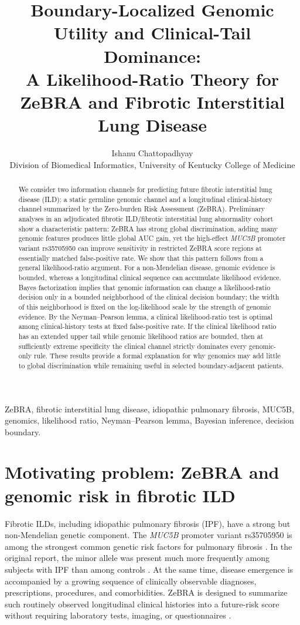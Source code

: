 \documentclass[journal]{IEEEtran}
\title{Boundary-Localized Genomic Utility and Clinical-Tail Dominance:\\
A Likelihood-Ratio Theory for ZeBRA and Fibrotic Interstitial Lung Disease}
\author{Ishanu Chattopadhyay\\
Division of Biomedical Informatics, University of Kentucky College of Medicine}
\begin{document}
\maketitle

\begin{abstract}
We consider two information channels for predicting future fibrotic interstitial lung disease (ILD): a static germline genomic channel and a longitudinal clinical-history channel summarized by the Zero-burden Risk Assessment (ZeBRA). Preliminary analyses in an adjudicated fibrotic ILD/fibrotic interstitial lung abnormality cohort show a characteristic pattern: ZeBRA has strong global discrimination, adding many genomic features produces little global AUC gain, yet the high-effect \textit{MUC5B} promoter variant rs35705950 can improve sensitivity in restricted ZeBRA score regions at essentially matched false-positive rate. We show that this pattern follows from a general likelihood-ratio argument. For a non-Mendelian disease, genomic evidence is bounded, whereas a longitudinal clinical sequence can accumulate likelihood evidence. Bayes factorization implies that genomic information can change a likelihood-ratio decision only in a bounded neighborhood of the clinical decision boundary; the width of this neighborhood is fixed on the log-likelihood scale by the strength of genomic evidence. By the Neyman--Pearson lemma, a clinical likelihood-ratio test is optimal among clinical-history tests at fixed false-positive rate. If the clinical likelihood ratio has an extended upper tail while genomic likelihood ratios are bounded, then at sufficiently extreme specificity the clinical channel strictly dominates every genomic-only rule. These results provide a formal explanation for why genomics may add little to global discrimination while remaining useful in selected boundary-adjacent patients.
\end{abstract}

\begin{IEEEkeywords}
ZeBRA, fibrotic interstitial lung disease, idiopathic pulmonary fibrosis, MUC5B, genomics, likelihood ratio, Neyman--Pearson lemma, Bayesian inference, decision boundary.
\end{IEEEkeywords}

\section{Motivating problem: ZeBRA and genomic risk in fibrotic ILD}

Fibrotic ILDs, including idiopathic pulmonary fibrosis (IPF), have a strong but non-Mendelian genetic component. The \textit{MUC5B} promoter variant rs35705950 is among the strongest common genetic risk factors for pulmonary fibrosis \cite{Seibold2011,Fingerlin2013,Allen2020}. In the original report, the minor allele was present much more frequently among subjects with IPF than among controls \cite{Seibold2011}. At the same time, disease emergence is accompanied by a growing sequence of clinically observable diagnoses, prescriptions, procedures, and comorbidities. ZeBRA is designed to summarize such routinely observed longitudinal clinical histories into a future-risk score without requiring laboratory tests, imaging, or questionnaires \cite{Onishchenko2026}.
\end{document}
